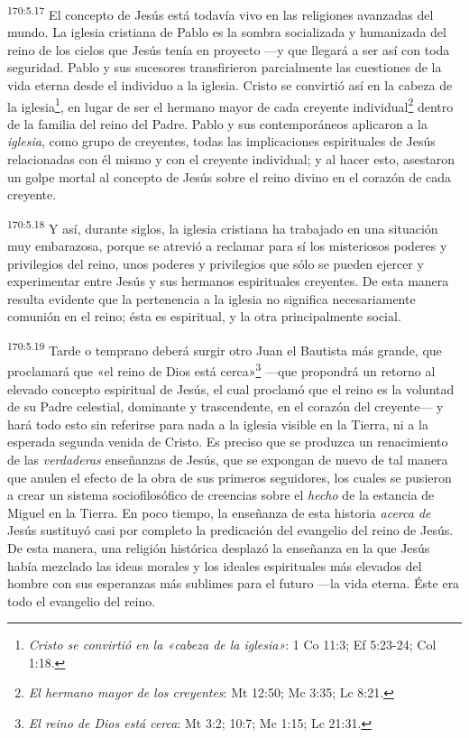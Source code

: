 \par
\textsuperscript{170:5.17} El concepto de Jesús está todavía vivo en las religiones avanzadas del mundo. La iglesia cristiana de Pablo es la sombra socializada y humanizada del reino de los cielos que Jesús tenía en proyecto ---y que llegará a ser así con toda seguridad. Pablo y sus sucesores transfirieron parcialmente las cuestiones de la vida eterna desde el individuo a la iglesia. Cristo se convirtió así en la cabeza de la iglesia\footnote{\textit{Cristo se convirtió en la «cabeza de la iglesia»}: 1 Co 11:3; Ef 5:23-24; Col 1:18.}, en lugar de ser el hermano mayor de cada creyente individual\footnote{\textit{El hermano mayor de los creyentes}: Mt 12:50; Mc 3:35; Lc 8:21.} dentro de la familia del reino del Padre. Pablo y sus contemporáneos aplicaron a la \textit{iglesia}, como grupo de creyentes, todas las implicaciones espirituales de Jesús relacionadas con él mismo y con el creyente individual; y al hacer esto, asestaron un golpe mortal al concepto de Jesús sobre el reino divino en el corazón de cada creyente.

\par
\textsuperscript{170:5.18} Y así, durante siglos, la iglesia cristiana ha trabajado en una situación muy embarazosa, porque se atrevió a reclamar para sí los misteriosos poderes y privilegios del reino, unos poderes y privilegios que sólo se pueden ejercer y experimentar entre Jesús y sus hermanos espirituales creyentes. De esta manera resulta evidente que la pertenencia a la iglesia no significa necesariamente comunión en el reino; ésta es espiritual, y la otra principalmente social.

\par
\textsuperscript{170:5.19} Tarde o temprano deberá surgir otro Juan el Bautista más grande, que proclamará que «el reino de Dios está cerca»\footnote{\textit{El reino de Dios está cerca}: Mt 3:2; 10:7; Mc 1:15; Lc 21:31.} ---que propondrá un retorno al elevado concepto espiritual de Jesús, el cual proclamó que el reino es la voluntad de su Padre celestial, dominante y trascendente, en el corazón del creyente--- y hará todo esto sin referirse para nada a la iglesia visible en la Tierra, ni a la esperada segunda venida de Cristo. Es preciso que se produzca un renacimiento de las \textit{verdaderas} enseñanzas de Jesús, que se expongan de nuevo de tal manera que anulen el efecto de la obra de sus primeros seguidores, los cuales se pusieron a crear un sistema sociofilosófico de creencias sobre el \textit{hecho} de la estancia de Miguel en la Tierra. En poco tiempo, la enseñanza de esta historia \textit{acerca de} Jesús sustituyó casi por completo la predicación del evangelio del reino de Jesús. De esta manera, una religión histórica desplazó la enseñanza en la que Jesús había mezclado las ideas morales y los ideales espirituales más elevados del hombre con sus esperanzas más sublimes para el futuro ---la vida eterna. Éste era todo el evangelio del reino.

